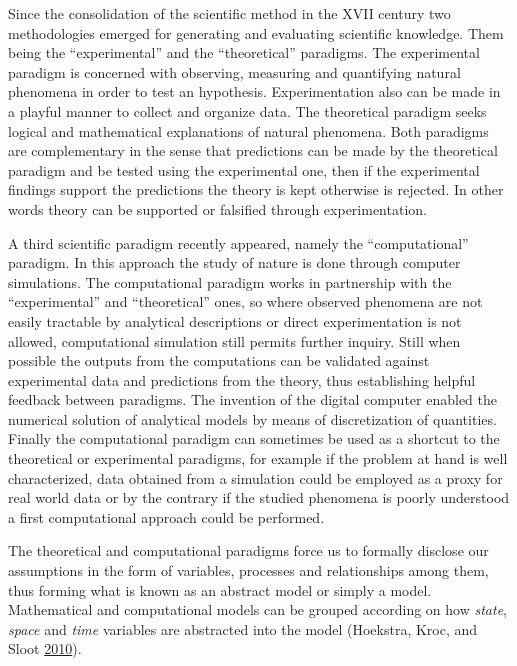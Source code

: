 \documentclass[
]{book}
\begin{document}
Since the consolidation of the scientific method in the XVII century two methodologies emerged for generating and evaluating scientific knowledge. Them being the ``experimental'' and the ``theoretical'' paradigms. The experimental paradigm is concerned with observing, measuring and quantifying natural phenomena in order to test an hypothesis. Experimentation also can be made in a playful manner to collect and organize data. The theoretical paradigm seeks logical and mathematical explanations of natural phenomena. Both paradigms are complementary in the sense that predictions can be made by the theoretical paradigm and be tested using the experimental one, then if the experimental findings support the predictions the theory is kept otherwise is rejected. In other words theory can be supported or falsified through experimentation.

A third scientific paradigm recently appeared, namely the ``computational'' paradigm. In this approach the study of nature is done through computer simulations. The computational paradigm works in partnership with the ``experimental'' and ``theoretical'' ones, so where observed phenomena are not easily tractable by analytical descriptions or direct experimentation is not allowed, computational simulation still permits further inquiry. Still when possible the outputs from the computations can be validated against experimental data and predictions from the theory, thus establishing helpful feedback between paradigms. The invention of the digital computer enabled the numerical solution of analytical models by means of discretization of quantities. Finally the computational paradigm can sometimes be used as a shortcut to the theoretical or experimental paradigms, for example if the problem at hand is well characterized, data obtained from a simulation could be employed as a proxy for real world data or by the contrary if the studied phenomena is poorly understood a first computational approach could be performed.

The theoretical and computational paradigms force us to formally disclose our assumptions in the form of variables, processes and relationships among them, thus forming what is known as an abstract model or simply a model. Mathematical and computational models can be grouped according on how \emph{state}, \emph{space} and \emph{time} variables are abstracted into the model (Hoekstra, Kroc, and Sloot \protect\hyperlink{ref-hoekstra2010simulating}{2010}).
\end{document}
